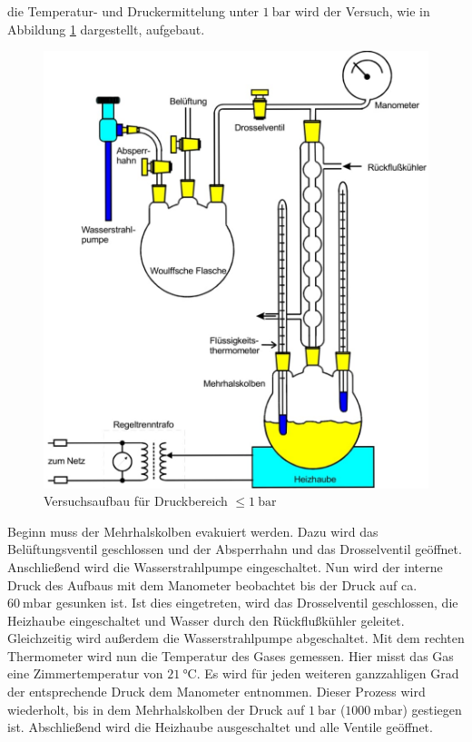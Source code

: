 \justifying die Temperatur- und Druckermittelung unter $\SI{1}{\bar}$ wird der Versuch, wie in Abbildung \ref{fig:2} dargestellt,
aufgebaut.

\begin{figure}
    \centering
    \includegraphics[width=0.75\linewidth]{./images/k1bar.jpg}
    \caption{Versuchsaufbau für Druckbereich $\leq \SI{1}{\bar}$ \cite{V203}}
    \label{fig:2}
\end{figure}
\newpage

\justifying Beginn muss der Mehrhalskolben evakuiert werden. Dazu wird das Belüftungsventil geschlossen und der Absperrhahn und
das Drosselventil geöffnet. Anschließend wird die Wasserstrahlpumpe eingeschaltet. Nun wird der interne Druck des Aufbaus mit dem Manometer
beobachtet bis der Druck auf ca. $\SI{60}{\milli\bar}$ gesunken ist. Ist dies eingetreten, wird das Drosselventil geschlossen, die Heizhaube
eingeschaltet und Wasser durch den Rückflußkühler geleitet. Gleichzeitig wird außerdem die Wasserstrahlpumpe abgeschaltet. Mit dem rechten
Thermometer wird nun die Temperatur des Gases gemessen. Hier misst das Gas eine Zimmertemperatur von $\SI{21}{\celsius}$. Es wird für jeden 
weiteren ganzzahligen Grad der entsprechende Druck dem Manometer entnommen. Dieser Prozess wird wiederholt, bis in dem Mehrhalskolben der Druck 
auf $\SI{1}{\bar}$ ($\SI{1000}{\milli\bar}$) gestiegen ist. Abschließend wird die Heizhaube ausgeschaltet und alle Ventile geöffnet.  

